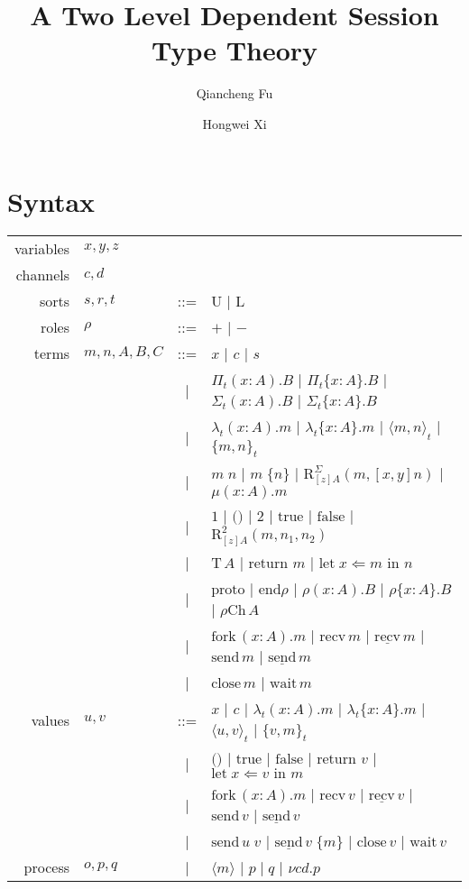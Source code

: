 \documentclass{article}
\title{A Two Level Dependent Session Type Theory}
\author[1]{Qiancheng Fu}
\author[1]{Hongwei Xi}
\affil[1]{Boston University}
\newcommand{\Un}{\text{U}}
\newcommand{\Ln}{\text{L}}
\newcommand{\PiR}[3]{\Pi_{#1}({#2}).{#3}}
\newcommand{\PiI}[3]{\Pi_{#1}\{{#2}\}.{#3}}
\newcommand{\lamR}[3]{\lambda_{#1}({#2}).{#3}}
\newcommand{\lamI}[3]{\lambda_{#1}\{{#2}\}.{#3}}
\newcommand{\appR}[2]{{#1}\;{#2}}
\newcommand{\appI}[2]{{#1}\;\{{#2}\}}
\newcommand{\SigR}[3]{\Sigma_{#1}({#2}).{#3}}
\newcommand{\SigI}[3]{\Sigma_{#1}\{{#2}\}.{#3}}
\newcommand{\pairR}[3]{\langle{{#1},{#2}}\rangle_{#3}}
\newcommand{\pairI}[3]{\{{#1},{#2}\}_{#3}}
\newcommand{\SigElim}[3]{\text{R}_{#1}^{\Sigma}({#2},{#3})}
\newcommand{\fix}[2]{\mu({#1}).{#2}}
\newcommand{\unit}{\text{1}}
\newcommand{\ii}{\text{()}}
\newcommand{\bool}{\text{2}}
\newcommand{\btrue}{\text{true}}
\newcommand{\bfalse}{\text{false}}
\newcommand{\boolElim}[4]{\text{R}_{#1}^{\bool}({#2},{#3},{#4})}
\newcommand{\T}[1]{\text{T}\,{#1}}
\newcommand{\return}[1]{\text{return }{#1}}
\newcommand{\letin}[3]{\text{let}\;{#1}\Leftarrow{#2}\text{ in }{#3}}
\newcommand{\proto}{\text{proto}}
\newcommand{\protoEnd}[1]{\text{end}{#1}}
\newcommand{\actI}[3]{{#1}\{{#2}\}.{#3}}
\newcommand{\actR}[3]{{#1}({#2}).{#3}}
\newcommand{\Ch}[2]{{#1}\text{Ch}\,{#2}}
\newcommand{\fork}[2]{\text{fork}\,({#1}).{#2}}
\newcommand{\recvI}[1]{\underline{\text{recv}}\,{#1}}
\newcommand{\recvR}[1]{\text{recv}\,{#1}}
\newcommand{\sendI}[1]{\underline{\text{send}}\,{#1}}
\newcommand{\sendR}[1]{\text{send}\,{#1}}
\newcommand{\close}[1]{\text{close}\,{#1}}
\newcommand{\wait}[1]{\text{wait}\,{#1}}
\newcommand{\scope}[2]{\nu{#1}.{#2}}
\begin{document}
\maketitle

\section{Syntax}
\begin{center}
  \begin{tabular}{r l c l}
    variables & $x, y, z$   &     &               \\
    channels  & $c, d$      &     &               \\
    sorts     & $s, r, t$   & ::= & $\Un$ | $\Ln$ \\
    roles     & $\rho$      & ::= & $+$ | $-$ \\
    terms     & $m,n,A,B,C$ & ::= & $x$ | $c$ | $s$ \\
              &             & \;| & $\PiR{t}{x : A}{B}$ | $\PiI{t}{x : A}{B}$
                                    | $\SigR{t}{x : A}{B}$ | $\SigI{t}{x : A}{B}$ \\
              &             & \;| & $\lamR{t}{x : A}{m}$ | $\lamI{t}{x : A}{m}$
                                    | $\pairR{m}{n}{t}$ | $\pairI{m}{n}{t}$ \\
              &             & \;| & $\appR{m}{n}$ | $\appI{m}{n}$ | $\SigElim{[z]A}{m}{[x,y]n}$ | $\fix{x : A}{m}$ \\
              &             & \;| & $\unit$ | $\ii$ | $\bool$ | $\btrue$ | $\bfalse$
                                    | $\boolElim{[z]A}{m}{n_{1}}{n_{2}}$ \\
              &             & \;| & $\T{A}$ | $\return{m}$ | $\letin{x}{m}{n}$ \\
              &             & \;| & $\proto$ | $\protoEnd{\rho}$
                                    | $\actR{\rho}{x : A}{B}$ | $\actI{\rho}{x : A}{B}$ | $\Ch{\rho}{A}$ \\
              &             & \;| & $\fork{x : A}{m}$ | $\recvR{m}$ | $\recvI{m}$
                                    | $\sendR{m}$ | $\sendI{m}$ \\
              &             & \;| & $\close{m}$ | $\wait{m}$ \\
    values    & $u, v$      & ::= & $x$ | $c$ | $\lamR{t}{x : A}{m}$ | $\lamI{t}{x : A}{m}$
                                    | $\pairR{u}{v}{t}$ | $\pairI{v}{m}{t}$ \\
              &             & \;| & $\ii$ | $\btrue$ | $\bfalse$ | $\return{v}$ | $\letin{x}{v}{m}$ \\
              &             & \;| & $\fork{x : A}{m}$ | $\recvR{v}$ | $\recvI{v}$ | $\sendR{v}$ | $\sendI{v}$ \\
              &             & \;| & $\appR{\sendR{u}}{v}$ | $\appI{\sendI{v}}{m}$ | $\close{v}$ | $\wait{v}$ \\
    process   & $o, p, q$   & \;| & $\langle m \rangle$ | $p \mid q$ | $\scope{cd}{p}$
  \end{tabular}
\end{center}
\end{document}
